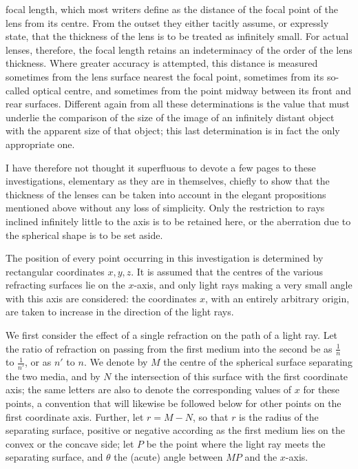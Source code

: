 focal length, which most writers define as the distance of the focal point of the lens from its centre. From the outset they either tacitly assume, or expressly state, that the thickness of the lens is to be treated as infinitely small. For actual lenses, therefore, the focal length retains an indeterminacy of the order of the lens thickness. Where greater accuracy is attempted, this distance is measured sometimes from the lens surface nearest the focal point, sometimes from its so-called optical centre, and sometimes from the point midway between its front and rear surfaces. Different again from all these determinations is the value that must underlie the comparison of the size of the image of an infinitely distant object with the apparent size of that object; this last determination is in fact the only appropriate one.

I have therefore not thought it superfluous to devote a few pages to these investigations, elementary as they are in themselves, chiefly to show that the thickness of the lenses can be taken into account in the elegant propositions mentioned above without any loss of simplicity. Only the restriction to rays inclined infinitely little to the axis is to be retained here, or the aberration due to the spherical shape is to be set aside.

The position of every point occurring in this investigation is determined by rectangular coordinates $x,y,z$. It is assumed that the centres of the various refracting surfaces lie on the $x$-axis, and only light rays making a very small angle with this axis are considered: the coordinates $x$, with an entirely arbitrary origin, are taken to increase in the direction of the light rays.

We first consider the effect of a single refraction on the path of a light ray. Let the ratio of refraction on passing from the first medium into the second be as $\frac1n$ to $\frac1{n'}$, or as $n'$ to $n$. We denote by $M$ the centre of the spherical surface separating the two media, and by $N$ the intersection of this surface with the first coordinate axis; the same letters are also to denote the corresponding
values of $x$ for these points, a convention that will likewise be followed below for other points on the first coordinate axis. Further, let $r=M-N$, so that $r$ is the radius of the separating surface, positive or negative according as the first medium lies on the convex or the concave side; let $P$ be the point where the light ray meets the separating surface, and $\theta$ the (acute) angle between $MP$ and the $x$-axis.

